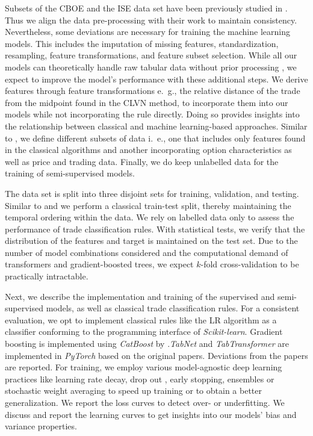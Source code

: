Subsets of the \gls{CBOE} and the \gls{ISE} data set have been previously studied in \textcite{grauerOptionTradeClassification2022}. Thus we align the data pre-processing with their work to maintain consistency. Nevertheless, some deviations are necessary for training the machine learning models. This includes the imputation of missing features, standardization, resampling, feature transformations, and feature subset selection. While all our models can theoretically handle raw tabular data without prior processing \autocites{arikTabNetAttentiveInterpretable2020}{prokhorenkovaCatBoostUnbiasedBoosting2018}{huangTabTransformerTabularData2020}, we expect to improve the model's performance with these additional steps. We derive features through feature transformations e.~g., the relative distance of the trade from the midpoint found in the CLVN method, to incorporate them into our models while not incorporating the rule directly. Doing so provides insights into the relationship between classical and machine learning-based approaches. Similar to \textcite{ronenMachineLearningTrade2022}, we define different subsets of data i.~e., one that includes only features found in the classical algorithms and another incorporating option characteristics as well as price and trading data. Finally, we do keep unlabelled data for the training of semi-supervised models.

The data set is split into three disjoint sets for training, validation, and testing. Similar to \textcite{ellisAccuracyTradeClassification2000} and \textcite{ronenMachineLearningTrade2022} we perform a classical train-test split, thereby maintaining the temporal ordering within the data. We rely on labelled data only to assess the performance of trade classification rules. With statistical tests, we verify that the distribution of the features and target is maintained on the test set. Due to the number of model combinations considered and the computational demand of transformers and gradient-boosted trees, we expect $k$-fold cross-validation to be practically intractable.

Next, we describe the implementation and training of the supervised and semi-supervised models, as well as classical trade classification rules. 
For a consistent evaluation, we opt to implement classical rules like the LR algorithm as a classifier conforming to the programming interface of \textit{Scikit-learn}\autocite{pedregosaScikitlearnMachineLearning2018}.
Gradient boosting is implemented using \textit{CatBoost} by \textcite{prokhorenkovaCatBoostUnbiasedBoosting2018}.\textit{TabNet} and \textit{TabTransformer} are implemented in \textit{PyTorch} \autocite{paszkePyTorchImperativeStyle2019} based on the original papers. Deviations from the papers are reported.
For training, we employ various model-agnostic deep learning practices like learning rate decay, drop out \autocite{hintonImprovingNeuralNetworks2012}, early stopping, ensembles \autocite{huangSnapshotEnsemblesTrain2017} or stochastic weight averaging \autocite{izmailovAveragingWeightsLeads2019} to speed up training or to obtain a better generalization. We report the loss curves to detect over- or underfitting. We discuss and report the learning curves to get insights into our models' bias and variance properties.  


